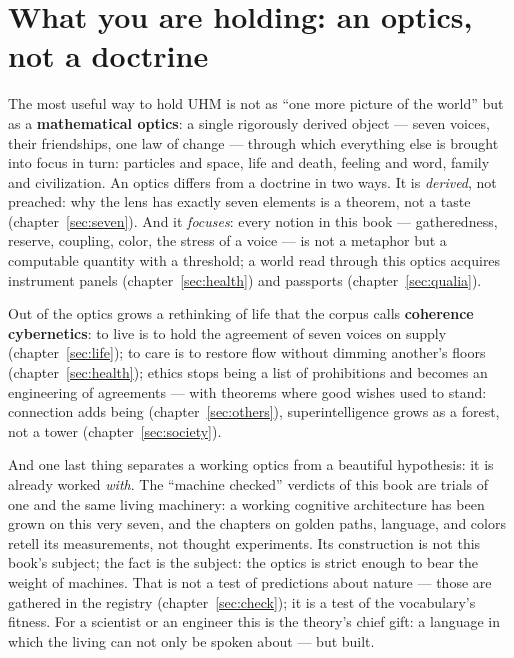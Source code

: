 \documentclass[11pt,letterpaper]{article}
\begin{document}
\section*{What you are holding: an optics, not a doctrine}

The most useful way to hold UHM is not as ``one more picture of the
world'' but as a \textbf{mathematical optics}: a single rigorously
derived object --- seven voices, their friendships, one law of
change --- through which everything else is brought into focus in
turn: particles and space, life and death, feeling and word, family
and civilization. An optics differs from a doctrine in two ways. It
is \emph{derived}, not preached: why the lens has exactly seven
elements is a theorem, not a taste (chapter~\ref{sec:seven}). And it
\emph{focuses}: every notion in this book --- gatheredness, reserve,
coupling, color, the stress of a voice --- is not a metaphor but a
computable quantity with a threshold; a world read through this
optics acquires instrument panels (chapter~\ref{sec:health}) and
passports (chapter~\ref{sec:qualia}).

Out of the optics grows a rethinking of life that the corpus calls
\textbf{coherence cybernetics}: to live is to hold the agreement of
seven voices on supply (chapter~\ref{sec:life}); to care is to
restore flow without dimming another's floors
(chapter~\ref{sec:health}); ethics stops being a list of
prohibitions and becomes an engineering of agreements --- with
theorems where good wishes used to stand: connection adds being
(chapter~\ref{sec:others}), superintelligence grows as a forest,
not a tower (chapter~\ref{sec:society}).

And one last thing separates a working optics from a beautiful
hypothesis: it is already worked \emph{with}. The ``machine
checked'' verdicts of this book are trials of one and the same
living machinery: a working cognitive architecture has been grown
on this very seven, and the chapters on golden paths, language, and
colors retell its measurements, not thought experiments. Its
construction is not this book's subject; the fact is the subject:
the optics is strict enough to bear the weight of machines. That is
not a test of predictions about nature --- those are gathered in
the registry (chapter~\ref{sec:check}); it is a test of the
vocabulary's fitness. For a scientist or an engineer this is the
theory's chief gift: a language in which the living can not only be
spoken about --- but built.
\end{document}

